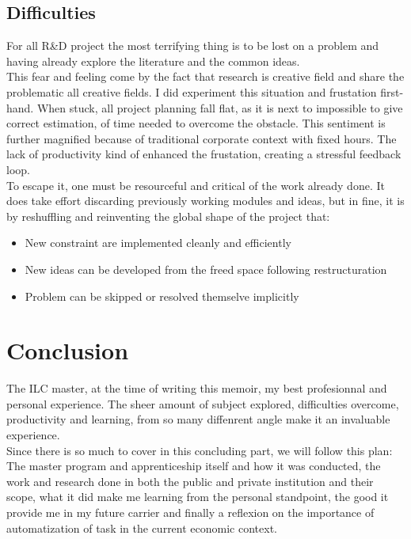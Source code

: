 \documentclass[12pt]{memoir}
\begin{document}
\subsection{Difficulties}
For all R\&D project the most terrifying thing is to be lost on a problem and 
having already explore the literature and the common ideas.\\ 
This fear and feeling come by the fact that research is creative field and share the 
problematic all creative fields. I did experiment this situation and frustation first-hand.
When stuck, all project planning fall flat, as it is next to impossible to give correct estimation,
 of time needed to overcome the obstacle. This sentiment is further magnified because of traditional corporate
context with fixed hours. The lack of productivity kind of enhanced the frustation, 
creating a stressful feedback loop.\\
To escape it, one must be resourceful and critical of the work already done. It does take effort discarding previously 
working modules and ideas, but in fine, it is by reshuffling and reinventing the global shape of the project that: 
\begin{itemize}
  \item New constraint are implemented cleanly and efficiently
  \item New ideas can be developed from the freed space following restructuration
  \item Problem can be skipped or resolved themselve implicitly
\end{itemize}
    

\section{Conclusion}

The ILC master, at the time of writing this memoir, my best profesionnal and personal experience. 
The sheer amount of subject explored, difficulties overcome, productivity and learning, from so many
 diffenrent angle make it an invaluable experience.\\
Since there is so much to cover in this concluding part, we will follow this plan: The master program and apprenticeship 
itself and how it was conducted, the work and research done in both the public and private institution and their scope,
 what it did make me learning from the personal standpoint, the good it provide me in my future carrier and finally a 
reflexion on the importance of automatization of task in the current economic context.\\
\\
\end{document}
